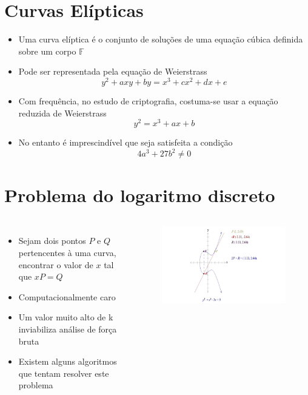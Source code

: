 \documentclass{beamer}
\begin{document}
\section{Curvas Elípticas}
\begin{frame}
\begin{itemize}
\item Uma curva elíptica é o conjunto de soluções de uma equação cúbica definida sobre um corpo $\mathbb{F}$
\item Pode ser representada pela equação de Weierstrass
$$ y^2 + axy + by = x^3 + cx^2 + dx + e$$
\item Com frequência, no estudo de criptografia, costuma-se usar a equação reduzida de Weierstrass
$$ y^2 = x^3 + ax + b $$
\item No entanto é imprescindível que seja satisfeita a condição
$$ 4a^3 + 27b^2 \neq 0$$
\end{itemize}
\end{frame}

\section{Problema do logaritmo discreto}
\begin{frame}
\begin{columns}[c]
\begin{itemize}
\item Sejam dois pontos $P$ e $Q$ pertencentes à uma curva, encontrar o valor de $x$ tal que $xP = Q$
\item Computacionalmente caro
\item Um valor muito alto de k inviabiliza análise de força bruta
\item Existem alguns algoritmos que tentam resolver este problema
\end{itemize}

\begin{figure}
\includegraphics[scale=0.3]{multiplicacao_ponto}
\end{figure}
\end{columns}
\end{frame}
\end{document}
